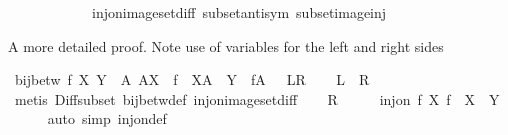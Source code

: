 \begin{isabellebody}
\ \ \ \ \ \ \ \ \ \ \ \ inj{\isacharunderscore}{\kern0pt}on{\isacharunderscore}{\kern0pt}image{\isacharunderscore}{\kern0pt}set{\isacharunderscore}{\kern0pt}diff\ subset{\isacharunderscore}{\kern0pt}antisym\ subset{\isacharunderscore}{\kern0pt}image{\isacharunderscore}{\kern0pt}inj{\isacharparenright}{\kern0pt}%
\endisatagproof
{\isafoldproof}%
%
\isadelimproof
%
\endisadelimproof
%
\begin{isamarkuptext}%
A more detailed proof. Note use of variables for the left and right sides%
\end{isamarkuptext}\isamarkuptrue%
\isamarkupfalse%
\ {\isachardoublequoteopen}bij{\isacharunderscore}{\kern0pt}betw\ f\ X\ Y\ {\isasymlongleftrightarrow}\ {\isacharparenleft}{\kern0pt}{\isasymforall}A{\isachardot}{\kern0pt}\ A{\isasymsubseteq}X\ {\isasymlongrightarrow}\ f\ {\isacharbackquote}{\kern0pt}\ {\isacharparenleft}{\kern0pt}X{\isasymsetminus}A{\isacharparenright}{\kern0pt}\ {\isacharequal}{\kern0pt}\ Y\ {\isasymsetminus}\ f{\isacharbackquote}{\kern0pt}A{\isacharparenright}{\kern0pt}{\isachardoublequoteclose}\ \ {\isacharparenleft}{\kern0pt}\ {\isachardoublequoteopen}{\isacharquery}{\kern0pt}L{\isacharequal}{\kern0pt}{\isacharquery}{\kern0pt}R{\isachardoublequoteclose}{\isacharparenright}{\kern0pt}\isanewline
%
\isadelimproof
%
\endisadelimproof
%
\isatagproof
{}\isamarkupfalse%
\isanewline
\ \ \isamarkupfalse%
\ {\isachardoublequoteopen}{\isacharquery}{\kern0pt}L\ {\isasymLongrightarrow}\ {\isacharquery}{\kern0pt}R{\isachardoublequoteclose}\isanewline
\ \ \ \ \isamarkupfalse%
\ {\isacharparenleft}{\kern0pt}metis\ Diff{\isacharunderscore}{\kern0pt}subset\ bij{\isacharunderscore}{\kern0pt}betw{\isacharunderscore}{\kern0pt}def\ inj{\isacharunderscore}{\kern0pt}on{\isacharunderscore}{\kern0pt}image{\isacharunderscore}{\kern0pt}set{\isacharunderscore}{\kern0pt}diff{\isacharparenright}{\kern0pt}\isanewline
\ \ \isamarkupfalse%
\ {\isacharquery}{\kern0pt}R\isanewline
\ \ \isamarkupfalse%
\ \isamarkupfalse%
\ {\isachardoublequoteopen}inj{\isacharunderscore}{\kern0pt}on\ f\ X{\isachardoublequoteclose}\ {\isachardoublequoteopen}f\ {\isacharbackquote}{\kern0pt}\ X\ {\isacharequal}{\kern0pt}\ Y{\isachardoublequoteclose}\isanewline
\ \ \ \ \isamarkupfalse%
\ {\isacharparenleft}{\kern0pt}auto\ simp{\isacharcolon}{\kern0pt}\ inj{\isacharunderscore}{\kern0pt}on{\isacharunderscore}{\kern0pt}def{\isacharparenright}{\kern0pt}\isanewline

\end{isabellebody}
